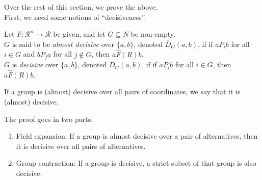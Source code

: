 	Over the rest of this section, we prove the above.\\
	First, we need some notions of ``decisiveness''.

	\begin{fdef}
		Let $F : \mathcal{R}^n \to \mathcal{R}$ be given, and let $G \subseteq N$ be non-empty.\\
		$G$ is said to be \emph{almost decisive} over $\{a,b\}$, denoted $\overline{D}_G(a,b)$, if if $a P_i b$ for all $i \in G$ and $b P_j a$ for all $j \not\in G$, then $a \hat{F}(R) b$. \\
		$G$ is \emph{decisive} over $\{a,b\}$, denoted $D_G(a,b)$, if if $a P_i b$ for all $i \in G$, then $a \hat{F}(R) b$.
	\end{fdef}
	If a group is (almost) decisive over all pairs of coordinates, we say that it is (almost) decisive.

	The proof goes in two parts.
	\begin{enumerate}
		\item Field expansion: If a group is almost decisive over a pair of alternatives, then it is decisive over all pairs of alternatives.
		\item Group contraction: If a group is decisive, a strict subset of that group is also decisive.
	\end{enumerate}

